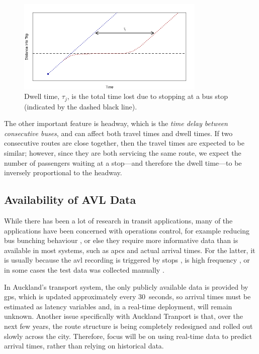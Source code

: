 \documentclass[12pt,a4paper]{article}
\begin{document}
\begin{figure}[bt]
  \centering
  \includegraphics[width=0.8\textwidth]{dwell_time.png}
  \caption{Dwell time, $\tau_j$, is the total time lost due to stopping at a bus stop (indicated by the dashed black line).}
  \label{fig:dwell-time}
\end{figure}

The other important feature is headway,
which is the \emph{time delay between consecutive buses},
and can affect both travel times and dwell times.
If two consecutive routes are close together,
then the travel times are expected to be similar;
however, since they are both servicing the same route,
we expect the number of passengers waiting at a stop---and therefore
the dwell time---to be inversely proportional to the headway.





\subsection{Availability of AVL Data}
\label{sec:data-types}

While there has been a lot of research in transit applications,
many of the applications have been concerned with operations control,
for example reducing bus bunching behaviour \citep{hans-etal:2015},
or else they require more informative data than is available in most systems,
such as \glspl{apc} and actual arrival times.
For the latter, it is usually because the \gls{avl} recording is triggered by stops
\citep{hans-etal:2015},
is high frequency \citep{chang-etal:2010},
or in some cases the test data was collected manually
\citep{yu-etal:2010}.


In Auckland's transport system, the only publicly available data is provided
by \gls{gps}, which is updated approximately every 30~seconds,
so arrival times must be estimated as latency variables and,
in a real-time deployment, will remain unknown.
Another issue specifically with Auckland Tranport is that,
over the next few years,
the route structure is being completely redesigned
and rolled out slowly across the city.
Therefore, focus will be on using real-time data to predict arrival times,
rather than relying on historical data.
\end{document}
